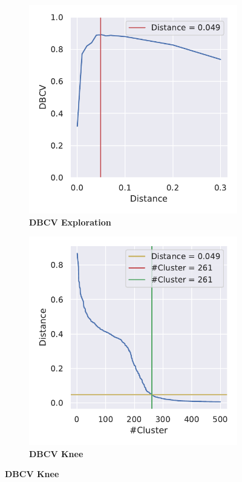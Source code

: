 \begin{figure}
    \centering
    \begin{subfigure}[b]{0.475\textwidth}
        \caption[\Acrshort{DBCV} Exploration]{\textbf{\Acrshort{DBCV} Exploration}}
        \label{subfig:UMAP_Cluster_DBCV_Explo_4}            \includegraphics[width=\textwidth]{UMAP/Cluster_DBCV_Segment_4.pdf}
    \end{subfigure}
    \hfill
    \begin{subfigure}[b]{0.475\textwidth}
        \caption[\Acrshort{DBCV} Knee]{\textbf{\Acrshort{DBCV} Knee}}
        \label{subfig:UMAP_Cluster_DBCV_Elbow_4}            \includegraphics[width=\textwidth]{UMAP/Cluster_Elbow_DBCV_Segment_4.pdf}

\end{subfigure}
\end{figure}
